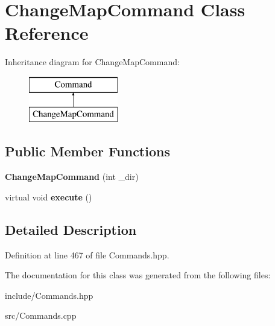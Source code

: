 \hypertarget{class_change_map_command}{}\section{Change\+Map\+Command Class Reference}
\label{class_change_map_command}
Inheritance diagram for Change\+Map\+Command\+:\begin{figure}[H]
\begin{center}
\leavevmode
\includegraphics[height=2.000000cm]{class_change_map_command}
\end{center}
\end{figure}
\subsection*{Public Member Functions}
\begin{DoxyCompactItemize}
\item 
\hypertarget{class_change_map_command_ac7420c1e84133ccbd8296b808830785e}{}{\bfseries Change\+Map\+Command} (int \+\_\+dir)\label{class_change_map_command_ac7420c1e84133ccbd8296b808830785e}

\item 
\hypertarget{class_change_map_command_a11ae38e39bf7d930a4911d732e183595}{}virtual void {\bfseries execute} ()\label{class_change_map_command_a11ae38e39bf7d930a4911d732e183595}

\end{DoxyCompactItemize}


\subsection{Detailed Description}


Definition at line 467 of file Commands.\+hpp.



The documentation for this class was generated from the following files\+:\begin{DoxyCompactItemize}
\item 
include/Commands.\+hpp\item 
src/Commands.\+cpp\end{DoxyCompactItemize}
